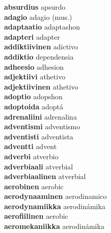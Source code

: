 \textbf{absurdius } apsurdo \\
\textbf{adagio } adagio (mus.) \\
\textbf{adaptaatio } adaptashon \\
\textbf{adapteri } adapter \\
\textbf{addiktiivinen } adictivo \\
\textbf{addiktio } dependensia \\
\textbf{adheesio } adhesion \\
\textbf{adjektiivi } athetivo \\
\textbf{adjektiivinen } athetivo \\
\textbf{adoptio } adopshon \\
\textbf{adoptoida } adoptá \\
\textbf{adrenaliini } adrenalina \\
\textbf{adventismi } adventismo \\
\textbf{adventisti } adventista \\
\textbf{adventti } advent \\
\textbf{adverbi } atverbio \\
\textbf{adverbiaali } atverbial \\
\textbf{adverbiaalinen } atverbial \\
\textbf{aerobinen } aerobic \\
\textbf{aerodynaaminen } aerodinamico \\
\textbf{aerodynamiikka } aerodinámika \\
\textbf{aerofiilinen } aerobic \\
\textbf{aeromekaniikka } aerodinámika \\
